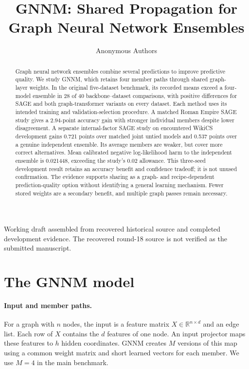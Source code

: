 \documentclass{article}
\title{GNNM: Shared Propagation for Graph Neural Network Ensembles}
\author{Anonymous Authors}
\begin{document}
\maketitle
\begin{center}
\footnotesize Working draft assembled from recovered historical source and completed development evidence. The recovered round-18 source is not verified as the submitted manuscript.
\end{center}

\begin{abstract}
Graph neural network ensembles combine several predictions to improve predictive quality. We study GNNM, which retains four member paths through shared graph-layer weights. In the original five-dataset benchmark, its recorded means exceed a four-model ensemble in 28 of 40 backbone--dataset comparisons, with positive differences for SAGE and both graph-transformer variants on every dataset. Each method uses its intended training and validation-selection procedure. A matched Roman Empire SAGE study gives a 2.94-point accuracy gain with stronger individual members despite lower disagreement. A separate internal-factor SAGE study on encountered WikiCS development gains 0.721 points over matched joint untied models and 0.537 points over a genuine independent ensemble. Its average members are weaker, but cover more correct alternatives. Mean calibrated negative log-likelihood harm to the independent ensemble is 0.021448, exceeding the study's 0.02 allowance. This three-seed development result retains an accuracy benefit and confidence tradeoff; it is not unused confirmation. The evidence supports sharing as a graph- and recipe-dependent prediction-quality option without identifying a general learning mechanism. Fewer stored weights are a secondary benefit, and multiple graph passes remain necessary.
\end{abstract}



\section{The GNNM model}\label{sec:method}
\paragraph{Input and member paths.}
For a graph with $n$ nodes, the input is a feature matrix $X\in\mathbb{R}^{n\times d}$ and an edge list. Each row of $X$ contains the $d$ features of one node. An input projector maps these features to $h$ hidden coordinates. GNNM creates $M$ versions of this map using a common weight matrix and short learned vectors for each member. We use $M=4$ in the main benchmark.
\end{document}
